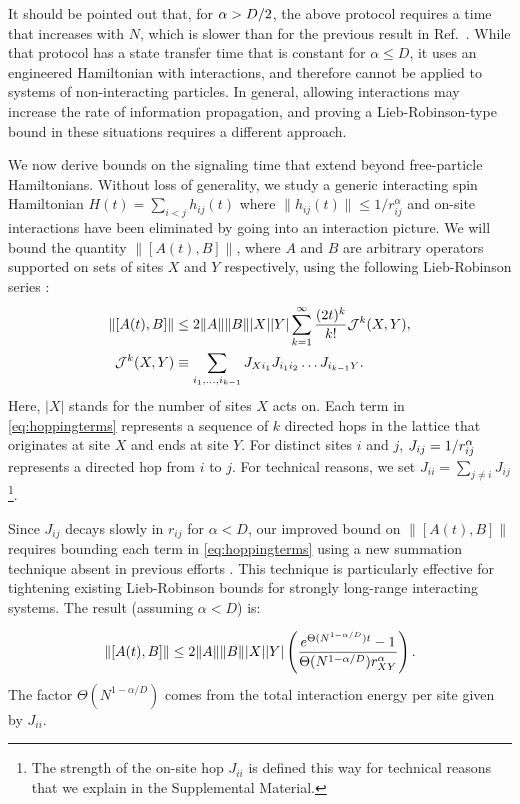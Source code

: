 It should be pointed out that, for $\alpha > D/2$, the above protocol requires a time that increases with $N$, which is slower than for the previous result in Ref.~\cite{Eldredge17}.
While that protocol has a state transfer time that is constant for $\alpha\le D$, it uses an engineered Hamiltonian with interactions, and therefore cannot be applied to systems of non-interacting particles.
In general, allowing interactions may increase the rate of information propagation, and proving a Lieb-Robinson-type bound in these situations requires a different approach.

We now derive bounds on the signaling time that extend beyond free-particle Hamiltonians.
Without loss of generality, we study a generic interacting spin Hamiltonian $ 	H(t) = \sum_{i<j} h_{ij}(t)$ where $\|h_{ij}(t)\|\le 1/r_{ij}^{\alpha}$ and on-site interactions have been eliminated by going into an interaction picture.
We will bound the quantity $\|[A(t),B]\|$, where $A$ and $B$ are arbitrary operators supported on sets of sites $X$ and $Y$ respectively,  using the following Lieb-Robinson series \cite{HK}:
\begin{align}
	\label{eq:HKseries1}
	\|[A(t),B]\| &\le 2\|A\|\|B\||X||Y|\sum_{k=1}^{\infty}\frac{(2t)^{k}}{k!} \mathcal{J}^k(X,Y), \\
    \label{eq:hoppingterms}
	\mathcal{J}^k(X,Y) &\equiv \sum_{i_{1},\dots,i_{k-1}}J_{Xi_{1}}J_{i_{1}i_{2}}\dots J_{i_{k-1}Y}.
\end{align}
Here, $|X|$ stands for the number of sites $X$ acts on. Each term in \cref{eq:hoppingterms} represents a sequence of $k$ directed hops in the lattice that originates at site $X$ and ends at site $Y$.
For distinct sites $i$ and $j$, $J_{ij}=1/r_{ij}^{\alpha}$ represents a directed hop from $i$ to $j$.
For technical reasons, we set $J_{ii} = \sum_{j\ne i} J_{ij}$ \footnote{
The strength of the on-site hop $J_{ii}$ is defined this way for technical reasons that we explain in the Supplemental Material.}.

Since $J_{ij}$ decays slowly in $r_{ij}$ for $\alpha<D$, our improved bound on $\|[A(t),B]\|$ requires bounding each term in \cref{eq:hoppingterms} using a new summation technique \cite{SM} absent in previous efforts \cite{HK,Storch15}. This technique is particularly effective for tightening existing Lieb-Robinson bounds for strongly long-range interacting systems. The result (assuming $\alpha<D$) is:

\begin{equation}
\label{eq:newbound}
	\|[A(t),B]\| \le  2\|A\|\|B\||X||Y|\left(\frac{e^{\Theta(N^{1-\alpha/D})t}-1}{\Theta(N^{1-\alpha/D})r_{XY}^{\alpha}}\right).
\end{equation}
The factor $\Theta(N^{1-\alpha/D})$ \cite{bigO} comes from the total interaction energy per site given by $J_{ii}$.

